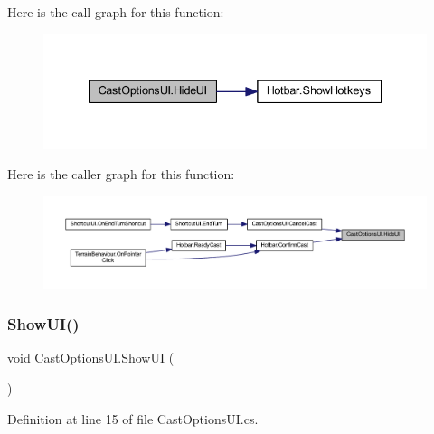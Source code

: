 Here is the call graph for this function\+:
\nopagebreak
\begin{figure}[H]
\begin{center}
\leavevmode
\includegraphics[width=335pt]{class_cast_options_u_i_affc98e48b03c51f4dddda5cb96920697_cgraph}
\end{center}
\end{figure}
Here is the caller graph for this function\+:
\nopagebreak
\begin{figure}[H]
\begin{center}
\leavevmode
\includegraphics[width=350pt]{class_cast_options_u_i_affc98e48b03c51f4dddda5cb96920697_icgraph}
\end{center}
\end{figure}
\mbox{\label{class_cast_options_u_i_a37c4fa85c666ede5418cd5d7e524ce35}} 
\subsubsection{\texorpdfstring{ShowUI()}{ShowUI()}}
{\footnotesize\ttfamily void Cast\+Options\+U\+I.\+Show\+UI (\begin{DoxyParamCaption}{ }\end{DoxyParamCaption})}



Definition at line 15 of file Cast\+Options\+U\+I.\+cs.

